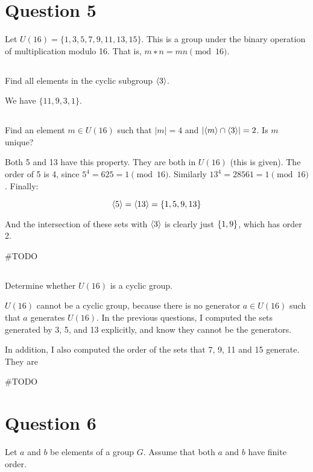 \documentclass[a4paper,12pt]{article}
\DeclarePairedDelimiter{\set}{\lbrace}{\rbrace}
\DeclarePairedDelimiter{\gen}{\langle}{\rangle}
\begin{document}
\section{Question 5}
Let $U (16) = \{ 1, 3, 5, 7, 9, 11, 13, 15 \}$. This is a group under the binary operation
of multiplication modulo 16. That is, $m ∗ n = mn \pmod{16}$.

\subsection{}
Find all elements in the cyclic subgroup $\gen{3}$. 

We have $\{ 11, 9, 3, 1 \}$.

\subsection{}

Find an element $m \in U (16)$ such that $|m| = 4$ and $| \gen{m} \cap \gen{3} | = 2$. Is $m$ unique?

Both 5 and 13 have this property. They are both in $U(16)$ (this is given). The order of 5 is 4, since $5^4 = 625 = 1 \pmod{16}$. Similarly $13^4 = 28561 = 1 \pmod{16}$. Finally:

\begin{equation}
\gen{5} = \gen{13} = \set{1, 5, 9, 13}
\end{equation}

And the intersection of these sets with $\gen{3}$ is clearly just $\set{1, 9}$, which has order 2.

\#TODO

\subsection{}

Determine whether $U (16)$ is a cyclic group. 

$U(16)$ cannot be a cyclic group, because there is no generator $a \in U(16)$ such that $a$ generates $U(16)$. In the previous questions, I computed the sets generated by 3, 5, and 13 explicitly, and know they cannot be the generators.

In addition, I also computed the order of the sets that 7, 9, 11 and 15 generate. They are 

\#TODO

\section{Question 6}
Let $a$ and $b$ be elements of a group $G$. Assume that both $a$ and $b$ have finite order.
\end{document}

